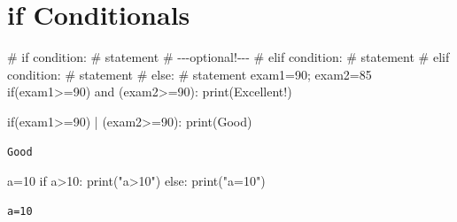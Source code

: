 \documentclass[
  letterpaper,
  DIV=11,
  numbers=noendperiod]{scrreprt}
\newenvironment{Shaded}{\begin{snugshade}}{\end{snugshade}}
\newcommand{\BuiltInTok}[1]{\textcolor[rgb]{0.00,0.23,0.31}{#1}}
\newcommand{\CommentTok}[1]{\textcolor[rgb]{0.37,0.37,0.37}{#1}}
\newcommand{\ControlFlowTok}[1]{\textcolor[rgb]{0.00,0.23,0.31}{#1}}
\newcommand{\DecValTok}[1]{\textcolor[rgb]{0.68,0.00,0.00}{#1}}
\newcommand{\KeywordTok}[1]{\textcolor[rgb]{0.00,0.23,0.31}{#1}}
\newcommand{\NormalTok}[1]{\textcolor[rgb]{0.00,0.23,0.31}{#1}}
\newcommand{\OperatorTok}[1]{\textcolor[rgb]{0.37,0.37,0.37}{#1}}
\newcommand{\StringTok}[1]{\textcolor[rgb]{0.13,0.47,0.30}{#1}}
\begin{document}
\section{if Conditionals}\label{if-conditionals}

\begin{Shaded}
\begin{Highlighting}[]
\CommentTok{\# if condition:}
\CommentTok{\#    statement}
\CommentTok{\# {-}{-}{-}optional!{-}{-}{-}}
\CommentTok{\# elif condition:}
\CommentTok{\#     statement}
\CommentTok{\# elif condition:}
\CommentTok{\#     statement}
\CommentTok{\# else:}
\CommentTok{\#     statement}
\NormalTok{exam1}\OperatorTok{=}\DecValTok{90}\OperatorTok{;}\NormalTok{ exam2}\OperatorTok{=}\DecValTok{85}
\ControlFlowTok{if}\NormalTok{(exam1}\OperatorTok{\textgreater{}=}\DecValTok{90}\NormalTok{) }\KeywordTok{and}\NormalTok{ (exam2}\OperatorTok{\textgreater{}=}\DecValTok{90}\NormalTok{):}
    \BuiltInTok{print}\NormalTok{(}\StringTok{\textquotesingle{}Excellent!\textquotesingle{}}\NormalTok{)}
\end{Highlighting}
\end{Shaded}

\begin{Shaded}
\begin{Highlighting}[]
\ControlFlowTok{if}\NormalTok{(exam1}\OperatorTok{\textgreater{}=}\DecValTok{90}\NormalTok{) }\OperatorTok{|}\NormalTok{ (exam2}\OperatorTok{\textgreater{}=}\DecValTok{90}\NormalTok{):}
    \BuiltInTok{print}\NormalTok{(}\StringTok{\textquotesingle{}Good\textquotesingle{}}\NormalTok{)}
\end{Highlighting}
\end{Shaded}

\begin{verbatim}
Good
\end{verbatim}

\begin{Shaded}
\begin{Highlighting}[]
\NormalTok{a}\OperatorTok{=}\DecValTok{10}
\ControlFlowTok{if}\NormalTok{ a}\OperatorTok{\textgreater{}}\DecValTok{10}\NormalTok{:}
    \BuiltInTok{print}\NormalTok{(}\StringTok{"a\textgreater{}10"}\NormalTok{)}
\ControlFlowTok{else}\NormalTok{:}
    \BuiltInTok{print}\NormalTok{(}\StringTok{"a=10"}\NormalTok{)}
\end{Highlighting}
\end{Shaded}

\begin{verbatim}
a=10
\end{verbatim}
\end{document}
